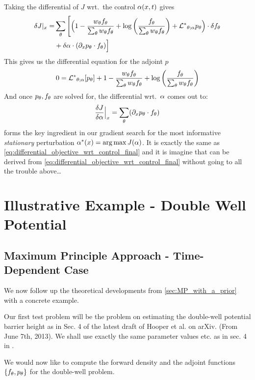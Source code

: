 \documentclass{article}
\begin{document}
Taking the differential of $J$ wrt.\ the control ${\alpha}(x,t)$ gives
\begin{align*}
\delta J|_{x} =&
\sum_{\theta} \Bigg[\Big(
1 - \frac{  w_{\theta} { f_{\theta}} }{\sum_{\theta} w_{\theta}{ f_{\theta}}} 
+ \log\left(\frac{f_{\theta}} {\sum_{\theta} { w_{\theta} } { f_{\theta}} }\right)   
+  { { \mathcal{L} }^* }_{{\theta};{\alpha}} p_{\theta}
\Big)  \cdot { \delta f_{\theta}} 
\\
&+ \delta {\alpha} \cdot ({\partial}_x { p_{\theta}} \cdot { f_{\theta}})
\Big]
\end{align*}
This gives us the differential equation for the adjoint $p$
\begin{equation}
0 = 
{ { \mathcal{L} }^* }_{{\theta};{\alpha}} [p_{\theta}] +  
1 - \frac{  w_{\theta} { f_{\theta}} }{\sum_{\theta} w_{\theta}{ f_{\theta}}} 
+ \log\left(\frac{f_{\theta}} {\sum_{\theta} { w_{\theta} } { f_{\theta}} }\right)   
\end{equation}
And once ${ p_{\theta}}, { f_{\theta}}$ are solved for, the differential wrt.\ ${\alpha}$ comes
out to:
\begin{equation}
\frac {\delta J}{\delta {\alpha}} \Big|_{x} = \sum_{\theta} ({\partial}_x { p_{\theta}} \cdot { f_{\theta}})
\label{eq:differential_objective_stationary_wrt_control_final}
\end{equation}
 forms the key ingredient
in our gradient search for the most informative {\sl stationary} perturbation
$\a^*(x) = \argmax J(\a)$. It is exactly the same as
\cref{eq:differential_objective_wrt_control_final} and it is imagine that
 can be derived
from \cref{eq:differential_objective_wrt_control_final} without going to all
the trouble above\ldots
 

\section{Illustrative Example - Double Well Potential}
\subsection{Maximum Principle Approach - Time-Dependent Case}
\label{sec:MP_Doublewell_TimeDependent}
We now follow up the theoretical developments from \cref{sec:MP_with_a_prior}
with a concrete example.

Our first test problem will be the problem on estimating the double-well
potential barrier height as in Sec. 4 of the latest draft of Hooper et al.
\cite{Lin} on arXiv. (From June 7th, 2013). We shall use exactly the same parameter values
etc. as in sec. 4 in \cite{Lin}.

We would now like to compute the forward density and the adjoint functions
$\{{ f_{\theta}}, { p_{\theta}}\}$ for the double-well problem.
\end{document}
